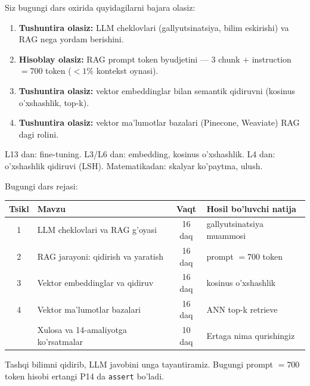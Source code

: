 \documentclass[aspectratio=169,11pt]{beamer}
\begin{document}
\begin{frame}{Siz bugungi dars oxirida quyidagilarni bajara olasiz:}
  \begin{enumerate}\setlength\itemsep{6pt}
    \item \textbf{Tushuntira olasiz:} LLM cheklovlari (gallyutsinatsiya, bilim
          eskirishi) va RAG nega yordam berishini.
    \item \textbf{Hisoblay olasiz:} RAG prompt token byudjetini --- 3 chunk
          $+$ instruction $= 700$ token ($<1\%$ kontekst oynasi).
    \item \textbf{Tushuntira olasiz:} vektor embeddinglar bilan semantik
          qidiruvni (kosinus o'xshashlik, top-k).
    \item \textbf{Tushuntira olasiz:} vektor ma'lumotlar bazalari (Pinecone,
          Weaviate) RAG dagi rolini.
  \end{enumerate}
  \vspace{4pt}
  \begin{tcolorbox}[defbox,title=Oldindan talab]
    \footnotesize
    L13 dan: fine-tuning. L3/L6 dan: embedding, kosinus o'xshashlik. L4 dan:
    o'xshashlik qidiruvi (LSH). Matematikadan: skalyar ko'paytma, ulush.
  \end{tcolorbox}
\end{frame}

\begin{frame}{Bugungi dars rejasi:}
  \begin{center}
  \small
  \begin{tabular}{c p{5.2cm} c p{3.0cm}}
    \toprule
    \textbf{Tsikl}& \textbf{Mavzu} & \textbf{Vaqt} & \textbf{Hosil bo'luvchi natija}\\
    \midrule
    1 & LLM cheklovlari va RAG g'oyasi & 16 daq & gallyutsinatsiya muammosi \\
    2 & RAG jarayoni: qidirish va yaratish & 16 daq & prompt $= 700$ token \\
    3 & Vektor embeddinglar va qidiruv & 16 daq & kosinus o'xshashlik \\
    4 & Vektor ma'lumotlar bazalari & 16 daq & ANN top-k retrieve \\
    \midrule
      & Xulosa va 14-amaliyotga ko'rsatmalar & 10 daq & Ertaga nima qurishingiz \\
    \bottomrule
  \end{tabular}
  \end{center}
  \vspace{4pt}
  \begin{tcolorbox}[warnbox,title=Bu dars RAG tizimiga olib keladi]
    \footnotesize\sloppy
    Tashqi bilimni qidirib, LLM javobini unga tayantiramiz. Bugungi
    prompt $= 700$ token hisobi ertangi P14 da \texttt{assert} bo'ladi.
  \end{tcolorbox}
\end{frame}
\end{document}
